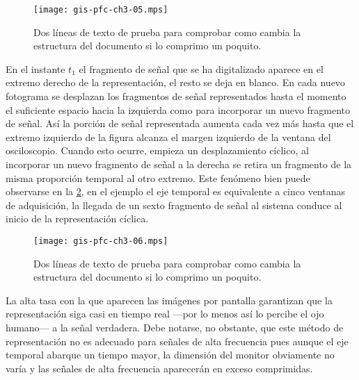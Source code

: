 \begin{figure}
	\begin{center}
		\texttt{[image: gis-pfc-ch3-05.mps]}
	\end{center}
	\caption[Dos líneas de prueba]{Dos líneas de texto de prueba para
	comprobar como cambia la estructura del documento si lo comprimo un
	poquito.}
	\label{fig:modconti}
\end{figure}

En el instante $t_1$ el fragmento de señal que se ha digitalizado aparece
en el extremo derecho de la representación, el resto se deja en blanco. En
cada nuevo fotograma se desplazan los fragmentos de señal representados
hasta el momento el suficiente espacio hacia la izquierda como para
incorporar un nuevo fragmento de señal. Así la porción de señal
representada aumenta cada vez más hasta que el extremo izquierdo de la
figura alcanza el margen izquierdo de la ventana del osciloscopio. Cuando
esto ocurre, empieza un desplazamiento cíclico, al incorporar un nuevo
fragmento de señal a la derecha se retira un fragmento de la misma
proporción temporal al otro extremo. Este fenómeno bien puede observarse en
la \cref{fig:modcontii}, en el ejemplo el eje temporal es equivalente a
cinco ventanas de adquisición, la llegada de un sexto fragmento de señal al
sistema conduce al inicio de la representación cíclica.

\begin{figure}
	\begin{center}
		\texttt{[image: gis-pfc-ch3-06.mps]}
	\end{center}
	\caption[Dos líneas de prueba]{Dos líneas de texto de prueba para
	comprobar como cambia la estructura del documento si lo comprimo un
	poquito.}
	\label{fig:modcontii}
\end{figure}

La alta tasa con la que aparecen las imágenes por pantalla garantizan que
la representación siga casi en tiempo real ---por lo menos así lo percibe
el ojo humano--- a la señal verdadera. Debe notarse, no obstante, que este
método de representación no es adecuado para señales de alta frecuencia
pues aunque el eje temporal abarque un tiempo mayor, la dimensión del
monitor obviamente no varía y las señales de alta frecuencia aparecerán en
exceso comprimidas.


